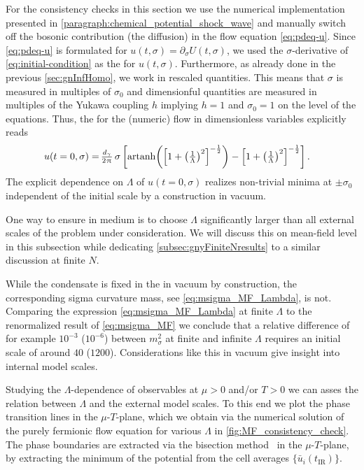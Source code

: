 For the consistency checks in this section we use the numerical implementation presented in \cref{paragraph:chemical_potential_shock_wave} and manually switch off the bosonic contribution (the diffusion) in the flow equation \eqref{eq:pdeq-u}.
Since \cref{eq:pdeq-u} is formulated for $u ( t, \sigma ) = \partial_\sigma  U ( t, \sigma )$, we used the $\sigma$-derivative of \cref{eq:initial-condition} as the \ic{} for $u ( t, \sigma )$. Furthermore, as already done in the previous \cref{sec:gnInfHomo}, we work in rescaled quantities. 
This means that $\sigma$ is measured in multiples of $\sigma_0$ and dimensionful quantities are measured in multiples of the Yukawa coupling $h$ \dash{} implying \wlogA{} $h = 1$ and $\sigma_0 = 1$ on the level of the equations. Thus, the \uv{} \ic{} for the (numeric) \frg{} flow in dimensionless variables explicitly reads
\begin{align}
	 u ( t = 0, \sigma ) = \, & \tfrac{d_\gamma}{2 \mkern1.0mu\uppi\mkern1.0mu} \, \sigma \, \bigg[ \mathrm{artanh} \bigg( \Big[ 1 + \big( \tfrac{1}{\Lambda} \big)^2 \Big]^{- \frac{1}{2}} \bigg) - \Big[ 1 + \big( \tfrac{1}{\Lambda} \big)^2 \Big]^{- \frac{1}{2}} \bigg] \, .	\label{eq:initial-condition_small_u}
\end{align}
The explicit dependence on $\Lambda$ of $u ( t = 0, \sigma )$ realizes non-trivial \ir{} minima at $\pm\sigma_0$ independent of the \uv{} initial scale by a \rgct{} construction in vacuum.

One way to ensure \rgcy{} in medium is to choose $\Lambda$ significantly larger than all external scales of the problem under consideration.
We will discuss this on mean-field level in this subsection while dedicating \cref{subsec:gnyFiniteNresults} to a similar discussion at finite $N$.\bigskip
	
While the condensate is fixed in the \ir{} in vacuum by construction, the corresponding sigma curvature mass, see \cref{eq:msigma_MF_Lambda}, is not.
Comparing the expression \eqref{eq:msigma_MF_Lambda} at finite $\Lambda$ to the renormalized result of \cref{eq:msigma_MF} we conclude that a relative difference of for example $10^{-3}$ ($10^{-6}$) between $m_\sigma^2$ at finite and infinite $\Lambda$ requires an \uv{} initial scale of around $40$ ($1200$).
Considerations like this in vacuum give insight into internal model scales.
	
Studying the $\Lambda$-dependence of observables at $\mu>0$ and/or $T>0$ we can asses the relation between $\Lambda$ and the external model scales.
To this end we plot the phase transition lines in the $\mu$-$T$-plane, which we obtain via the numerical solution of the purely fermionic \frg{} flow equation for various $\Lambda$ in \cref{fig:MF_consistency_check}. The phase boundaries are extracted via the bisection method~\cite{PresTeukVettFlan92,Press:1992zz} in the $\mu$-$T$-plane, by extracting the minimum of the \ir{} potential from the cell averages $\{ \bar{u}_i ( t_\mathrm{IR} ) \}$.

